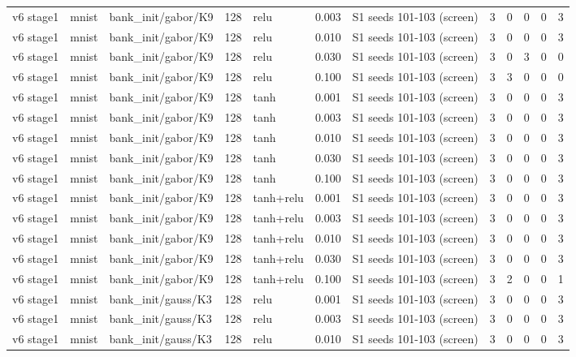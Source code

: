 \begin{table}[htbp]
{\begin{tabular}{@{}lllrlrlrrrrr@{}}
v6 stage1 & mnist & bank\_init/gabor/K9 & 128 & relu & 0.003 & S1 seeds 101-103 (screen) & 3 & 0 & 0 & 0 & 3 \\
v6 stage1 & mnist & bank\_init/gabor/K9 & 128 & relu & 0.010 & S1 seeds 101-103 (screen) & 3 & 0 & 0 & 0 & 3 \\
v6 stage1 & mnist & bank\_init/gabor/K9 & 128 & relu & 0.030 & S1 seeds 101-103 (screen) & 3 & 0 & 3 & 0 & 0 \\
v6 stage1 & mnist & bank\_init/gabor/K9 & 128 & relu & 0.100 & S1 seeds 101-103 (screen) & 3 & 3 & 0 & 0 & 0 \\
v6 stage1 & mnist & bank\_init/gabor/K9 & 128 & tanh & 0.001 & S1 seeds 101-103 (screen) & 3 & 0 & 0 & 0 & 3 \\
v6 stage1 & mnist & bank\_init/gabor/K9 & 128 & tanh & 0.003 & S1 seeds 101-103 (screen) & 3 & 0 & 0 & 0 & 3 \\
v6 stage1 & mnist & bank\_init/gabor/K9 & 128 & tanh & 0.010 & S1 seeds 101-103 (screen) & 3 & 0 & 0 & 0 & 3 \\
v6 stage1 & mnist & bank\_init/gabor/K9 & 128 & tanh & 0.030 & S1 seeds 101-103 (screen) & 3 & 0 & 0 & 0 & 3 \\
v6 stage1 & mnist & bank\_init/gabor/K9 & 128 & tanh & 0.100 & S1 seeds 101-103 (screen) & 3 & 0 & 0 & 0 & 3 \\
v6 stage1 & mnist & bank\_init/gabor/K9 & 128 & tanh+relu & 0.001 & S1 seeds 101-103 (screen) & 3 & 0 & 0 & 0 & 3 \\
v6 stage1 & mnist & bank\_init/gabor/K9 & 128 & tanh+relu & 0.003 & S1 seeds 101-103 (screen) & 3 & 0 & 0 & 0 & 3 \\
v6 stage1 & mnist & bank\_init/gabor/K9 & 128 & tanh+relu & 0.010 & S1 seeds 101-103 (screen) & 3 & 0 & 0 & 0 & 3 \\
v6 stage1 & mnist & bank\_init/gabor/K9 & 128 & tanh+relu & 0.030 & S1 seeds 101-103 (screen) & 3 & 0 & 0 & 0 & 3 \\
v6 stage1 & mnist & bank\_init/gabor/K9 & 128 & tanh+relu & 0.100 & S1 seeds 101-103 (screen) & 3 & 2 & 0 & 0 & 1 \\
v6 stage1 & mnist & bank\_init/gauss/K3 & 128 & relu & 0.001 & S1 seeds 101-103 (screen) & 3 & 0 & 0 & 0 & 3 \\
v6 stage1 & mnist & bank\_init/gauss/K3 & 128 & relu & 0.003 & S1 seeds 101-103 (screen) & 3 & 0 & 0 & 0 & 3 \\
v6 stage1 & mnist & bank\_init/gauss/K3 & 128 & relu & 0.010 & S1 seeds 101-103 (screen) & 3 & 0 & 0 & 0 & 3 \\

\end{tabular}}
\end{table}
